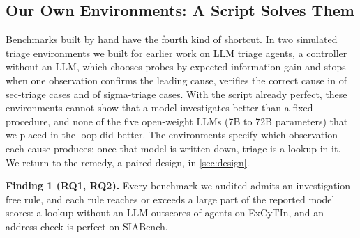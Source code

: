 \subsection{Our Own Environments: A Script Solves Them}
\label{sec:own}

Benchmarks built by hand have the fourth kind of shortcut. In two simulated triage environments we built for earlier work on LLM triage agents, a controller without an LLM, which chooses probes by expected information gain and stops when one observation confirms the leading cause, verifies the correct cause in \envSec{} of \envSecN{} sec-triage cases and \envSigma{} of \envSigmaN{} sigma-triage cases. With the script already perfect, these environments cannot show that a model investigates better than a fixed procedure, and none of the five open-weight LLMs (7B to 72B parameters) that we placed in the loop did better. The environments specify which observation each cause produces; once that model is written down, triage is a lookup in it. We return to the remedy, a paired design, in \cref{sec:design}.

\smallskip\noindent\textbf{Finding 1 (RQ1, RQ2).} Every benchmark we audited admits an investigation-free rule, and each rule reaches or exceeds a large part of the reported model scores: a lookup without an LLM outscores \oBelowGraph{} of \oModels{} agents on ExCyTIn, and an address check is perfect on SIABench.
